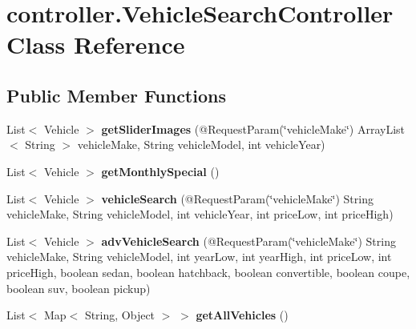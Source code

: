 \hypertarget{classcontroller_1_1_vehicle_search_controller}{}\section{controller.\+Vehicle\+Search\+Controller Class Reference}
\label{classcontroller_1_1_vehicle_search_controller}
\subsection*{Public Member Functions}
\begin{DoxyCompactItemize}
\item 
\mbox{\label{classcontroller_1_1_vehicle_search_controller_a91213edeb85089ae97175c5500065781}} 
List$<$ Vehicle $>$ {\bfseries get\+Slider\+Images} (@Request\+Param(\char`\"{}vehicle\+Make\char`\"{}) Array\+List$<$ String $>$ vehicle\+Make, String vehicle\+Model, int vehicle\+Year)
\item 
\mbox{\label{classcontroller_1_1_vehicle_search_controller_ac4b9e536279cd1f70864702cee878a86}} 
List$<$ Vehicle $>$ {\bfseries get\+Monthly\+Special} ()
\item 
\mbox{\label{classcontroller_1_1_vehicle_search_controller_aff267764e2b0ec2799b4a737a5f99ed6}} 
List$<$ Vehicle $>$ {\bfseries vehicle\+Search} (@Request\+Param(\char`\"{}vehicle\+Make\char`\"{}) String vehicle\+Make, String vehicle\+Model, int vehicle\+Year, int price\+Low, int price\+High)
\item 
\mbox{\label{classcontroller_1_1_vehicle_search_controller_aab0d6c61827936cedece38b52bbe2844}} 
List$<$ Vehicle $>$ {\bfseries adv\+Vehicle\+Search} (@Request\+Param(\char`\"{}vehicle\+Make\char`\"{}) String vehicle\+Make, String vehicle\+Model, int year\+Low, int year\+High, int price\+Low, int price\+High, boolean sedan, boolean hatchback, boolean convertible, boolean coupe, boolean suv, boolean pickup)
\item 
\mbox{\label{classcontroller_1_1_vehicle_search_controller_ab8112581880dd0349430260307387b88}} 
List$<$ Map$<$ String, Object $>$ $>$ {\bfseries get\+All\+Vehicles} ()
\end{DoxyCompactItemize}
